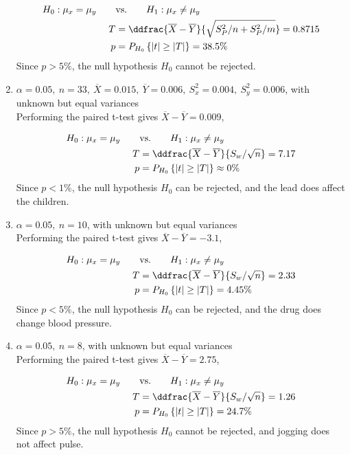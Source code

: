 \begin{enumerate}
	\begin{align}
		H_0 : \mu_x = \mu_y \qquad &\text{vs.} \qquad H_1 : \mu_x \neq \mu_y \nonumber \\
		T &= \ddfrac{ \overline{X} - \overline{Y} }{\sqrt{S_P^2/n + S_P^2/m}} = 0.8715 \nonumber \\
		p &= P_{H_0}\left\{|t| \geq |T|\right\} = 38.5\% 
	\end{align}
	Since $ p > 5\% $, the null hypothesis $ H_0 $ cannot be rejected.
	
	\item $\alpha = 0.05,\ n = 33,\ \overline{X} = 0.015,\ \overline{Y} = 0.006,\ S_x^2 = 0.004,\ S_y^2 = 0.006$, with unknown but equal variances\\
	Performing the paired t-test gives $ \overline{X} - \overline{Y} = 0.009 $,
	
	\begin{align}
		H_0 : \mu_x = \mu_y \qquad &\text{vs.} \qquad H_1 : \mu_x \neq \mu_y \nonumber \\
		T &= \ddfrac{ \overline{X} - \overline{Y} }{S_w/\sqrt{n}} = 7.17 \nonumber \\
		p &= P_{H_0}\left\{|t| \geq |T|\right\} \approx 0\% 
	\end{align}
	Since $ p < 1\% $, the null hypothesis $ H_0 $ can be rejected, and the lead does affect the children.
	
	\item $\alpha = 0.05,\ n = 10$, with unknown but equal variances\\
	Performing the paired t-test gives $ \overline{X} - \overline{Y} = -3.1 $,
	
	\begin{align}
		H_0 : \mu_x = \mu_y \qquad &\text{vs.} \qquad H_1 : \mu_x \neq \mu_y \nonumber \\
		T &= \ddfrac{ \overline{X} - \overline{Y} }{S_w/\sqrt{n}} = 2.33 \nonumber \\
		p &= P_{H_0}\left\{|t| \geq |T|\right\} = 4.45\% 
	\end{align}
	Since $ p < 5\% $, the null hypothesis $ H_0 $ can be rejected, and the drug does change blood pressure.
	
	\item $\alpha = 0.05,\ n = 8$, with unknown but equal variances\\
	Performing the paired t-test gives $ \overline{X} - \overline{Y} = 2.75 $,
	
	\begin{align}
		H_0 : \mu_x = \mu_y \qquad &\text{vs.} \qquad H_1 : \mu_x \neq \mu_y \nonumber \\
		T &= \ddfrac{ \overline{X} - \overline{Y} }{S_w/\sqrt{n}} = 1.26 \nonumber \\
		p &= P_{H_0}\left\{|t| \geq |T|\right\} = 24.7\% 
	\end{align}
	Since $ p > 5\% $, the null hypothesis $ H_0 $ cannot be rejected, and jogging does not affect pulse.
	

\end{enumerate}
